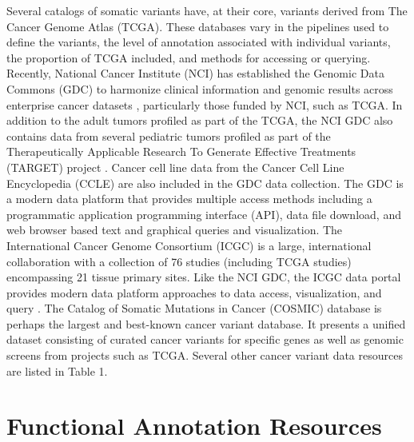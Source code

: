 \documentclass{article}
\begin{document}
Several catalogs of somatic variants have, at their core, variants
derived from The Cancer Genome Atlas (TCGA). These databases vary in
the pipelines used to define the variants, the level of annotation
associated with individual variants, the proportion of TCGA included,
and methods for accessing or querying. Recently, National Cancer
Institute (NCI) has established the Genomic Data Commons (GDC) to
harmonize clinical information and genomic results across enterprise
cancer datasets \cite{Grossman2016-sk}, particularly those funded by
NCI, such as TCGA. In addition to the adult tumors profiled as part of
the TCGA, the NCI GDC also contains data from several pediatric tumors
profiled as part of the Therapeutically Applicable Research To
Generate Effective Treatments (TARGET) project
\cite{noauthor_undated-ax}. Cancer cell line data from the Cancer Cell
Line Encyclopedia (CCLE) are also included \cite{Barretina2012-yz} in
the GDC data collection. The GDC is a modern data platform that
provides multiple access methods including a programmatic application
programming interface (API), data file download, and web browser based
text and graphical queries and visualization. The International Cancer
Genome Consortium (ICGC) is a large, international collaboration with
a collection of 76 studies (including TCGA studies) encompassing 21
tissue primary sites. Like the NCI GDC, the ICGC data portal provides
modern data platform approaches to data access, visualization, and
query \cite{Zhang2011-bl}. The Catalog of Somatic Mutations in Cancer
(COSMIC) database is perhaps the largest and best-known cancer variant
database. It presents a unified dataset consisting of curated cancer
variants for specific genes as well as genomic screens from projects
such as TCGA. Several other cancer variant data resources are listed
in Table 1.

\section{Functional Annotation Resources}
\end{document}

